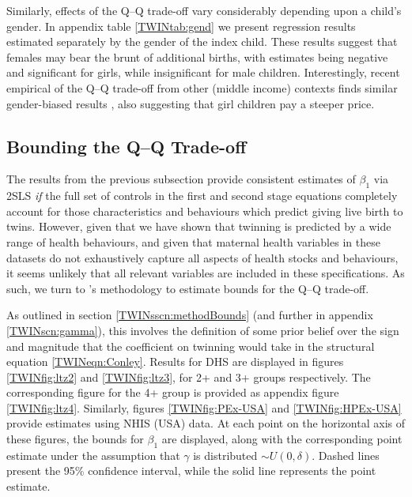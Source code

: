 \documentclass[subeqn]{article}
\begin{document}
\begin{spacing}{1.4}
Similarly, effects of the Q--Q trade-off vary considerably depending upon a 
child's gender. In appendix table \ref{TWINtab:gend} we present regression 
results estimated separately by the gender of the index child. These results 
suggest that females may bear the brunt of additional births, with estimates
being negative and significant for girls, while insignificant for male children. 
Interestingly, recent empirical of the Q--Q trade-off from other (middle income)
contexts finds similar gender-biased results \citep{SouzaPonczek2012}, also
suggesting that girl children pay a steeper price.



\subsection{Bounding the Q--Q Trade-off}           \label{TWINsscn:resultBounds}
The results from the previous subsection provide consistent estimates of 
$\beta_1$ via 2SLS \emph{if} the full set of controls in the first and second 
stage equations completely account for those characteristics and behaviours 
which predict giving live birth to twins. However, given that we have shown that 
twinning is predicted by a wide range of health behaviours, and given that 
maternal health variables in these datasets do not exhaustively capture all 
aspects of health stocks and behaviours, it seems unlikely that all relevant 
variables are included in these specifications. As such, we turn to 
\citeauthor{Conleyetal2012}'s \citeyear{Conleyetal2012} methodology to estimate 
bounds for the Q--Q trade-off.  

As outlined in section \ref{TWINsscn:methodBounds} (and further in appendix
\ref{TWINscn:gamma}), this involves the definition of some prior belief over 
the sign and magnitude that the coefficient on twinning would take in the 
structural equation \ref{TWINeqn:Conley}. Results for DHS are displayed in 
figures \ref{TWINfig:ltz2} and \ref{TWINfig:ltz3}, for 2+ and 3+ groups 
respectively. The corresponding figure for the 4+ group is provided as appendix
figure \ref{TWINfig:ltz4}. Similarly, figures \ref{TWINfig:PEx-USA} and
\ref{TWINfig:HPEx-USA} provide estimates using NHIS (USA) data. At each point 
on the horizontal axis of these figures, the bounds for $\beta_1$ are displayed, 
along with the corresponding point estimate under the assumption that $\gamma$ 
is distributed $\sim U(0,\delta)$. Dashed lines present the 95\% confidence 
interval, while the solid line represents the point estimate.


\end{spacing}
\end{document}
